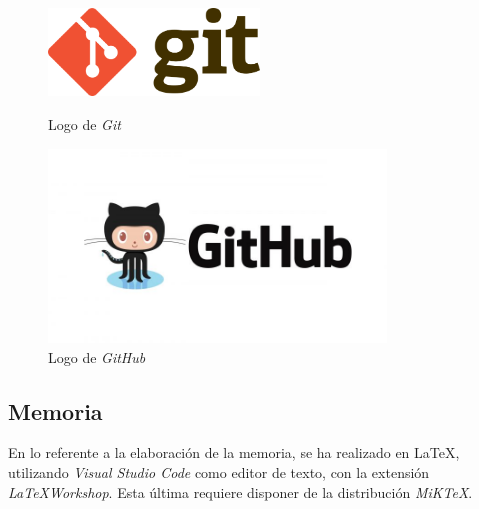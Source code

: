 \begin{figure}[H]
    \centering
    \begin{minipage}{0.38\textwidth}
        \centering
        \includegraphics[width=0.5\textwidth]{Figures/Logo_Git.png}
        \caption{Logo de \textit{Git}}
    \end{minipage} \hspace{2cm}
    \begin{minipage}{0.38\textwidth}
        \centering
        \includegraphics[width=0.8\textwidth]{Figures/Logo_GitHub.jpg}
        \caption{Logo de \textit{GitHub}}
    \end{minipage}
\end{figure}

\subsection{Memoria}
En lo referente a la elaboración de la memoria, se ha realizado en \LaTeX, utilizando \textit{Visual Studio Code} como editor 
de texto, con la extensión \textit{\LaTeX Workshop}. Esta última requiere disponer de la distribución \textit{MiKTeX}. 


